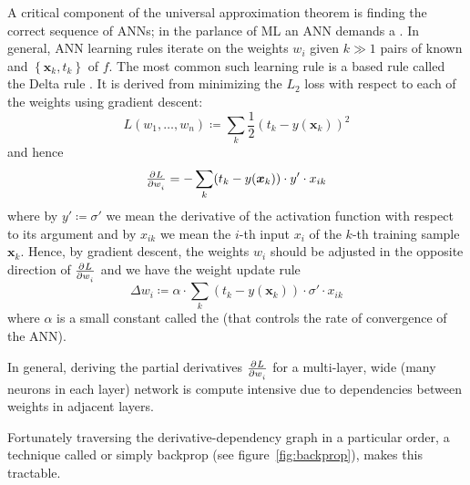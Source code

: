 A critical component of the universal approximation theorem is finding the correct sequence of ANNs; in the parlance of ML an ANN demands a .
%
In general, ANN learning rules iterate on the weights \(w_i\) given \(k \gg 1\)  pairs of known  and  \(\left\{ \bm{x}_k, t_k \right\}\) of \(f\). 
%
The most common such learning rule is a  based rule called the Delta rule \cite{widrow1960adaptive}.
%
It is derived from minimizing the \(L_2\) loss with respect to each of the weights using gradient descent:
\begin{equation}
    L(w_1, \dots, w_n) \coloneqq \sum_k \frac{1}{2} (t_k - y(\mathbf{x}_k))^2
    \label{eqn:loss}
\end{equation}
and hence
\begin{equation}
    \pd{L}{w_i} = - \sum_k(t_k-y(\bm{x}_k))\cdot y'\cdot x_{ik}
\end{equation}
where by \(y' \coloneqq \sigma'\) we mean the derivative of the activation function with respect to its argument and by \(x_{ik}\) we mean the \(i\)-th input \(x_i\) of the \(k\)-th training sample \(\bm{x}_k\).
%
Hence, by gradient descent, the weights \(w_i\) should be adjusted in the opposite direction of \(\pd{L}{w_i}\) and we have the weight update rule
\begin{equation}
    \Delta w_i \coloneqq \alpha \cdot \sum_k(t_k-y(\mathbf{x}_k))\cdot \sigma'\cdot x_{ik}
    \label{eqn:batchupdate}
\end{equation}
where \(\alpha\) is a small constant called the  (that controls the rate of convergence of the ANN).

In general, deriving the partial derivatives \(\pd{L}{w_i}\) for a multi-layer, wide (many neurons in each layer) network is compute intensive due to dependencies between weights in adjacent layers.
%

Fortunately traversing the derivative-dependency graph in a particular order, a technique called  or simply backprop (see figure~\ref{fig:backprop}), makes this tractable.

